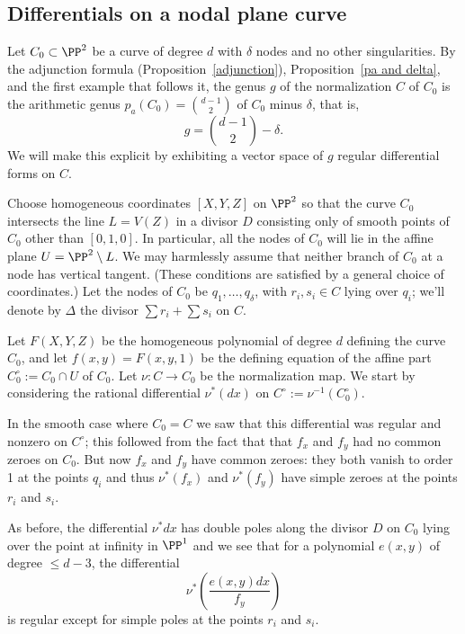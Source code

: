 \subsection{Differentials on a nodal plane curve}\label{canonical series on nodal plane curves}

Let $C_{0} \subset \PP^2$  be a curve of degree $d$ with $\delta$ nodes and no other singularities. By the adjunction
formula (Proposition~\ref{adjunction}), Proposition~\ref{pa and delta}, and the first example that follows it, 
the genus $g$ of the normalization $C$ of $C_{0}$ is
the arithmetic genus $p_{a}(C_{0}) = \binom{d-1}{2}$ of $C_{0}$ minus $\delta$, that is,
$$
g = \binom{d-1}{2} -\delta.
$$
We will make this explicit by exhibiting a vector space of $g$ regular differential forms on $C$.

Choose homogeneous coordinates  $[X,Y,Z]$ on $\PP^2$ so that the curve $C_0$ intersects the line $L = V(Z)$ in a divisor $D$ consisting only of smooth points of $C_{0}$  other than $[0,1,0]$. In particular,  all the nodes of $C_0$ will lie in the affine plane $U = \PP^2 \setminus L$.
We may harmlessly assume that  neither branch of $C_0$ at a node has vertical tangent. (These conditions are satisfied by a general choice of coordinates.) Let the nodes of $C_0$ be $q_1,\dots,q_\delta$, with $r_i, s_i \in C$ lying over $q_i$; we'll denote by $\Delta$ the divisor $\sum r_i + \sum s_i$ on $C$.

Let $F(X,Y,Z)$ be the homogeneous polynomial of degree $d$ defining the curve $C_0$, and let $f(x,y) = F(x,y,1)$ be the defining equation of the affine part $C_{0}^{\circ}:= C_0 \cap U$ of $C_0$. Let $\nu: C\to C_0$ be the normalization map. We start by considering the rational differential 
$\nu^*(dx)$ on 
$C^{\circ}:= \nu^{-1}(C_{0}^{\circ})$. 

In the smooth case where $C_{0}=C$ we saw that this differential was regular and nonzero on $C^{\circ}$; this followed from the fact that 
that $f_{x}$ and $f_{y}$ had no common zeroes on $C_0$. But now $f_{x}$ and $f_{y}$ have common zeroes: they both vanish to order 1 at the points $q_{i}$ and thus $\nu^*(f_{x})$ and $\nu^*(f_{y})$ have simple zeroes at the points $r_i$ and $s_i$. 

As before, the differential $\nu^*dx$ has  double poles along the divisor $D$ on $C_{0}$ lying over the point at infinity in $\PP^{1}$
and we see that for a polynomial $e(x,y)$ of degree $\leq d-3$, the differential
$$
\nu^*( \frac{e(x,y)dx}{f_{y}})
$$
is regular except for simple poles at the points $r_i$ and $s_i$.

